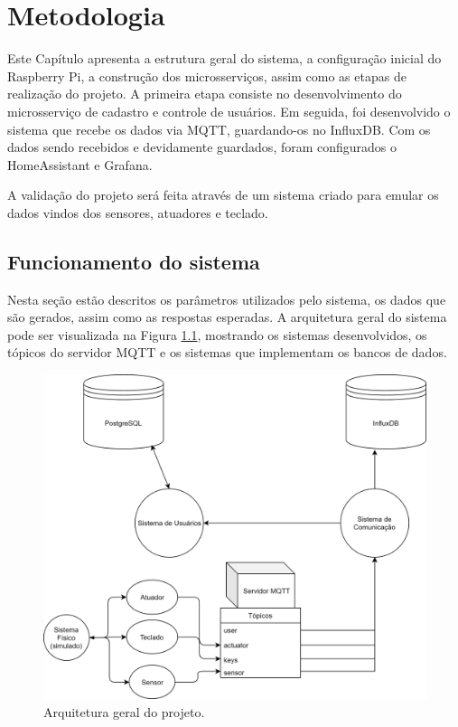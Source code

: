 \chapter{Metodologia}

Este Capítulo apresenta a estrutura geral do sistema, a configuração inicial do Raspberry Pi, a construção dos microsserviços, assim como as etapas de realização do projeto. A
primeira etapa consiste no desenvolvimento do microsserviço de cadastro e controle de usuários. Em seguida, foi desenvolvido o sistema que recebe os dados via MQTT, guardando-os no InfluxDB. Com os dados sendo recebidos e devidamente guardados, foram configurados o HomeAssistant e Grafana.

A validação do projeto será feita através de um sistema criado para emular os dados vindos dos sensores, atuadores e teclado. %

\section{Funcionamento do sistema} \label{sec:funcionamento}

Nesta seção estão descritos os parâmetros utilizados pelo sistema, os dados que são gerados, assim como as respostas esperadas. A arquitetura geral do sistema pode ser visualizada na Figura \ref{fig:arqgeral}, mostrando os sistemas desenvolvidos, os tópicos do servidor MQTT e os sistemas que implementam os bancos de dados.

\begin{figure}[htbp]
	\centering
	\includegraphics[width=0.7\linewidth]{figuras/ArquiteturaDoProjeto.png}
	\caption{Arquitetura geral do projeto.}
	\label{fig:arqgeral}
\end{figure}

